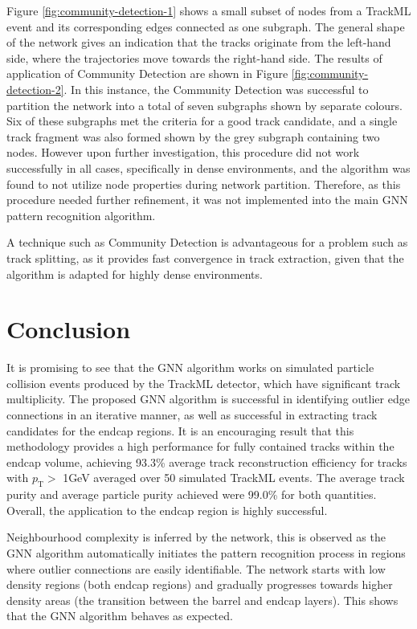 Figure \ref{fig:community-detection-1} shows a small subset of nodes from a TrackML event and its corresponding edges connected as one subgraph. The general shape of the network gives an indication that the tracks originate from the left-hand side, where the trajectories move towards the right-hand side. The results of application of Community Detection are shown in Figure \ref{fig:community-detection-2}. In this instance, the Community Detection was successful to partition the network into a total of seven subgraphs shown by separate colours. Six of these subgraphs met the criteria for a good track candidate, and a single track fragment was also formed shown by the grey subgraph containing two nodes. However upon further investigation, this procedure did not work successfully in all cases, specifically in dense environments, and the algorithm was found to not utilize node properties during network partition. Therefore, as this procedure needed further refinement, it was not implemented into the main GNN pattern recognition algorithm. 

A technique such as Community Detection is advantageous for a problem such as track splitting, as it provides fast convergence in track extraction, given that the algorithm is adapted for highly dense environments.





\section{Conclusion}

It is promising to see that the GNN algorithm works on simulated particle collision events produced by the TrackML detector, which have significant track multiplicity. The proposed GNN algorithm is successful in identifying outlier edge connections in an iterative manner, as well as successful in extracting track candidates for the endcap regions. It is an encouraging result that this methodology provides a high performance for fully contained tracks within the endcap volume, achieving 93.3\% average track reconstruction efficiency for tracks with $p_{\text{T}} >$ 1GeV averaged over 50 simulated TrackML events. The average track purity and average particle purity achieved were 99.0\% for both quantities. Overall, the application to the endcap region is highly successful.

Neighbourhood complexity is inferred by the network, this is observed as the GNN algorithm automatically initiates the pattern recognition process in regions where outlier connections are easily identifiable. The network starts with low density regions (both endcap regions) and gradually progresses towards higher density areas (the transition between the barrel and endcap layers). This shows that the GNN algorithm behaves as expected.


